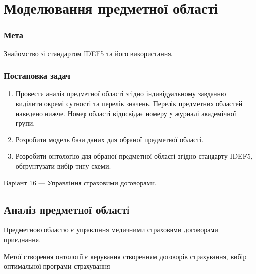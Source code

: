 



\newcommand{\labnumber}{1} %



\graphicspath{{figures/}}


\Ukrainian


\addtocounter{page}{1}

\section*{Моделювання предметної області}
\subsubsection*{Мета}
Знайомство зі стандартом IDEF5 та його використання.
\subsubsection*{Постановка задач}
\begin{enumerate}
  \item Провести аналіз предметної області згідно індивідуальному завданню виділити окремі сутності та перелік значень. 
  Перелік предметних областей наведено нижче. 
  Номер області відповідає номеру у журналі академічної групи.
  \item Розробити модель бази даних для обраної предметної області.
  \item Розробити онтологію для обраної предметної області згідно стандарту IDEF5, обґрунтувати вибір типу схеми.
\end{enumerate}

\begin{center}
Варіант 16 --- Управління страховими договорами.
\end{center}

\subsection*{Аналіз предметної області}
Предметною областю є управління медичними страховими договорами приєднання.

Метої створення онтології є керування створенням договорів страхування, вибір оптимальної програми страхування  

